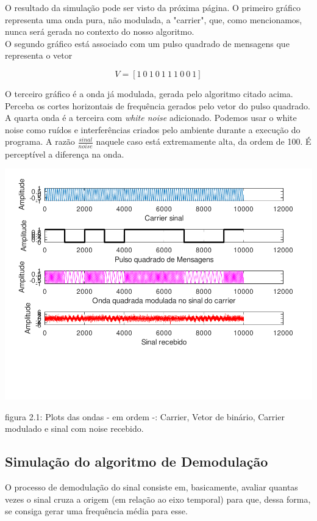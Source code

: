 \documentclass[11pt,a4paper]{report}
\begin{document}
	O resultado da simulação pode ser visto da próxima página. O primeiro gráfico representa uma onda pura, não modulada, a "carrier", que, como mencionamos, nunca será gerada no contexto do nosso algoritmo.\\
	
	O segundo gráfico está associado com um pulso quadrado de mensagens que representa o vetor 
	
	\[V = [1\ 0\ 1\ 0\ 1\ 1\ 1\ 0\ 0\ 1]\]
	
	O terceiro gráfico é a onda já modulada, gerada pelo algoritmo citado acima. Perceba os cortes horizontais de frequência gerados pelo vetor do pulso quadrado.\\
	
	A quarta onda é a terceira com {\it white noise} adicionado. Podemos usar o white noise como ruídos e interferências criados pelo ambiente durante a execução do programa. A razão $\frac{sinal}{noise}$ naquele caso está extremamente alta, da ordem de 100. É perceptível a diferença na onda.
	\begin{center}
	
	\includegraphics[clip, trim=0.0cm 0cm 0.0cm 0.0cm, width=1.00\textwidth]{sinais}
	
	\end{center}

\begin{center}
	{\footnotesize figura 2.1: Plots das ondas - em ordem -: Carrier, Vetor de binário, Carrier modulado e sinal com noise recebido.}
\end{center}

		\subsection{Simulação do algoritmo de Demodulação}
		O processo de demodulação do sinal consiste em, basicamente, avaliar quantas vezes o sinal cruza a origem (em relação ao eixo temporal) para que, dessa forma, se consiga gerar uma frequência média para esse.\\
		
\end{document}
